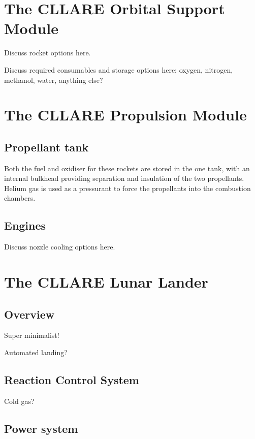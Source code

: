 \documentclass{report}
\begin{document}
\section{The CLLARE Orbital Support Module}

Discuss rocket options here.

Discuss required consumables and storage options here: oxygen, nitrogen, methanol, water, anything else?


\section{The CLLARE Propulsion Module}

\subsection{Propellant tank}

Both the fuel and oxidiser for these rockets are stored in the one tank, with an internal bulkhead providing separation and insulation of the two propellants.  Helium gas is used as a pressurant to force the propellants into the combustion chambers.

\subsection{Engines}

Discuss nozzle cooling options here.


\section{The CLLARE Lunar Lander}

\subsection{Overview}

Super minimalist!

Automated landing?

\subsection{Reaction Control System}

Cold gas?

\subsection{Power system}
\end{document}

